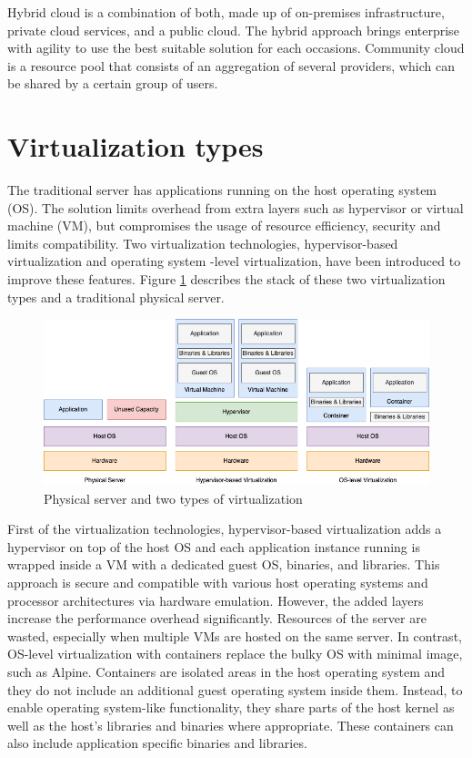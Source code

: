 Hybrid cloud is a combination of both, made up of on-premises infrastructure, private cloud services, and a public cloud. The hybrid approach brings enterprise with agility to use the best suitable solution for each occasions. \cite{NetApp} Community cloud is a resource pool that consists of an aggregation of several providers, which can be shared by a certain group of users. \cite{Taleb2017}


\section{Virtualization types}

The traditional server has applications running on the host operating system (OS). The solution limits overhead from extra layers such as hypervisor or virtual machine (VM), but compromises the usage of resource efficiency, security and limits compatibility. Two virtualization technologies, hypervisor-based virtualization and operating system -level virtualization, have been introduced to improve these features. Figure \ref{fig:VirtualizationTypes} describes the stack of these two virtualization types and a traditional physical server.

\begin{figure}[ht]
  \begin{center}
    \includegraphics[width=13.5cm]{LaTeX/images/VirtualizationTypes.png}
    \caption{Physical server and two types of virtualization}
    \label{fig:VirtualizationTypes}
  \end{center}
\end{figure}

First of the virtualization technologies, hypervisor-based virtualization adds a hypervisor on top of the host OS and each application instance running is wrapped inside a VM with a dedicated guest OS, binaries, and libraries. This approach is secure and compatible with various host operating systems and processor architectures via hardware emulation. However, the added layers increase the performance overhead significantly. Resources of the server are wasted, especially when multiple VMs are hosted on the same server. In contrast, OS-level virtualization with containers replace the bulky OS with minimal image, such as Alpine. Containers are isolated areas in the host operating system and they do not include an additional guest operating system inside them. Instead, to enable operating system-like functionality, they share parts of the host kernel as well as the host’s libraries and binaries where appropriate. These containers can also include application specific binaries and libraries. \cite{Toimela2017} 

